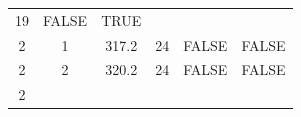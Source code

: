 \documentclass[]{article}
\theoremstyle{definition}
\theoremstyle{definition}
\theoremstyle{definition}
\theoremstyle{remark}
\begin{document}
\begin{longtable}[]{@{}cccccc@{}}
\begin{minipage}[t]{0.07\columnwidth}
19\strut
\end{minipage} & \begin{minipage}[t]{0.16\columnwidth}\centering\strut
FALSE\strut
\end{minipage} & \begin{minipage}[t]{0.09\columnwidth}\centering\strut
TRUE\strut
\end{minipage}\tabularnewline
\begin{minipage}[t]{0.10\columnwidth}\centering\strut
2\strut
\end{minipage} & \begin{minipage}[t]{0.09\columnwidth}\centering\strut
1\strut
\end{minipage} & \begin{minipage}[t]{0.09\columnwidth}\centering\strut
317.2\strut
\end{minipage} & \begin{minipage}[t]{0.07\columnwidth}\centering\strut
24\strut
\end{minipage} & \begin{minipage}[t]{0.16\columnwidth}\centering\strut
FALSE\strut
\end{minipage} & \begin{minipage}[t]{0.09\columnwidth}\centering\strut
FALSE\strut
\end{minipage}\tabularnewline
\begin{minipage}[t]{0.10\columnwidth}\centering\strut
2\strut
\end{minipage} & \begin{minipage}[t]{0.09\columnwidth}\centering\strut
2\strut
\end{minipage} & \begin{minipage}[t]{0.09\columnwidth}\centering\strut
320.2\strut
\end{minipage} & \begin{minipage}[t]{0.07\columnwidth}\centering\strut
24\strut
\end{minipage} & \begin{minipage}[t]{0.16\columnwidth}\centering\strut
FALSE\strut
\end{minipage} & \begin{minipage}[t]{0.09\columnwidth}\centering\strut
FALSE\strut
\end{minipage}\tabularnewline
\begin{minipage}[t]{0.10\columnwidth}\centering\strut
2\strut
\end{minipage} & \begin{minipage}[t]{0.09\columnwidth}\centering\strut

\end{minipage}
\end{longtable}
\end{document}
